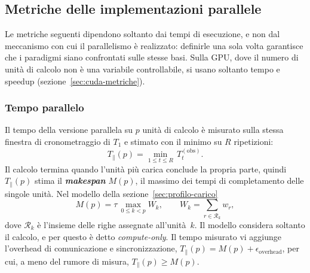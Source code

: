 \subsection{Metriche delle implementazioni parallele}
\label{sec:metriche-comuni}

Le metriche seguenti dipendono soltanto dai tempi di esecuzione, e non dal
meccanismo con cui il parallelismo è realizzato: definirle una sola volta
garantisce che i paradigmi siano confrontati sulle stesse basi. Sulla GPU, dove
il numero di unità di calcolo non è una variabile controllabile, si usano
soltanto tempo e speedup (sezione~\ref{sec:cuda-metriche}).

\subsubsection{Tempo parallelo}
Il tempo della versione parallela su $p$ unità di calcolo è misurato sulla
stessa finestra di cronometraggio di $T_1$ e stimato con il minimo su $R$
ripetizioni:
%
\begin{equation}
    T_\parallel(p) = \min_{1 \le t \le R}\, T_t^{(\mathrm{obs})}.
    \label{eq:Tpar}
\end{equation}
%
Il calcolo termina quando l'unità più carica conclude la propria parte, quindi
$T_\parallel(p)$ stima il \emph{\textbf{makespan}} $M(p)$, il massimo dei tempi
di completamento delle singole unità. Nel modello della
sezione~\ref{sec:profilo-carico}
%
\begin{equation}
    M(p) = \tau\,\max_{0 \le k < p} W_k,
    \qquad W_k = \sum_{r \in \mathcal{R}_k} w_r,
    \label{eq:makespan}
\end{equation}
%
dove $\mathcal{R}_k$ è l'insieme delle righe assegnate all'unità~$k$. Il modello
considera soltanto il calcolo, e per questo è detto \emph{compute-only}. Il
tempo misurato vi aggiunge l'overhead di comunicazione e sincronizzazione,
$T_\parallel(p) = M(p) + \epsilon_{\text{overhead}}$, per cui, a meno del rumore
di misura, $T_\parallel(p) \ge M(p)$.

